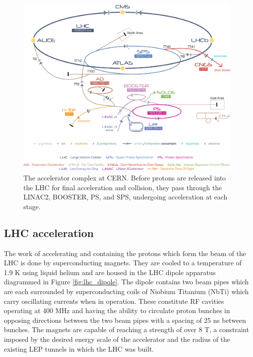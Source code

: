 \begin{figure}[htbp]
\includegraphics[width=\textwidth]{pdfs/experiment/cern_accelerator_complex.jpg}
\caption{
 The accelerator complex at CERN.
 Before protons are released into the LHC
  for final acceleration and collision, they pass through
  the LINAC2, BOOSTER, PS, and SPS, 
  undergoing acceleration %
  at each stage.
 }
\label{fig:lhc_complex}
\end{figure}


\subsection{LHC acceleration}
The work of accelerating and containing
 the protons which %
 form %
 the beam of
 the LHC is done by superconducting magnets. 
They are cooled to a temperature of 1.9 K
 using liquid helium and are housed in the
 LHC dipole apparatus diagrammed in Figure \ref{fig:lhc_dipole}.
The dipole contains two beam pipes which are
 each surrounded by superconducting coils
 of Niobium Titanium (NbTi)
 which carry oscillating currents when in operation.
These constitute RF cavities
 operating at 400 MHz and having the 
 ability to circulate proton
 bunches in opposing directions 
 between the two beam pipes
 with a spacing of 25 ns between bunches.
The magnets are capable of reaching 
 a strength of over 8 T, a constraint
 imposed by the desired energy scale 
 of the accelerator and the radius of the
 existing LEP tunnels
 in which the LHC was built.  

